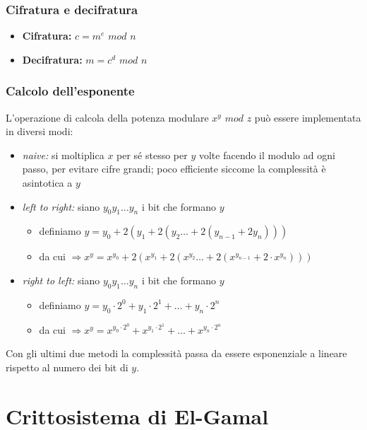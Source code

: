 \subsubsection{Cifratura e decifratura}

\begin{itemize}
    \item \textbf{Cifratura:} $c = m^e$ $mod$ $n$
    \item \textbf{Decifratura:} $m = c^d$ $mod$ $n$
\end{itemize}

\subsubsection{Calcolo dell'esponente}

L'operazione di calcola della potenza modulare $x^y$ $mod$ $z$ può essere implementata 
in diversi modi:
\begin{itemize}
    \item \textit{naive:} si moltiplica $x$ per sé stesso per $y$ volte facendo il modulo ad ogni passo, per 
    evitare cifre grandi; poco efficiente siccome la complessità è asintotica a $y$
    \item \textit{left to right:} siano $y_0y_1 \dots y_n$ i bit che formano $y$
    \begin{itemize}
        \item definiamo $y=y_0+2(y_1+2(y_2 \dots +2(y_{n-1}+2y_n)))$
        \item da cui $\Rightarrow x^y = x^{y_0} + 2(x^{y_1}+2(x^{y_2} \dots +2(x^{y_{n-1}} + 2 \cdot x^{y_n})))$
    \end{itemize}
    \item \textit{right to left:} siano $y_0y_1 \dots y_n$ i bit che formano $y$
    \begin{itemize}
        \item definiamo $y = y_0 \cdot 2^0 + y_1 \cdot 2^1 + \dots + y_n \cdot 2^n$
        \item da cui $\Rightarrow x^y = x^{y_0 \cdot 2^0} + x^{y_1 \cdot 2^1} + \dots + x^{y_n \cdot 2^n}$
    \end{itemize}
    
\end{itemize}

\noindent Con gli ultimi due metodi la complessità passa da essere esponenziale a lineare rispetto 
al numero dei bit di $y$.

\newpage
\section{Crittosistema di El-Gamal}

